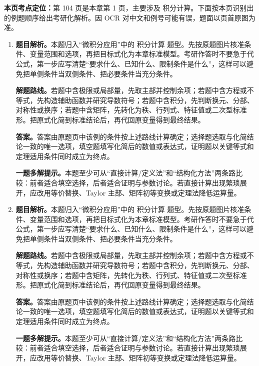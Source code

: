 \begin{solutionblock}
\textbf{本页考点定位：}第 104 页是本章第 1 页，主要涉及 积分计算。下面按本页识别出的例题顺序给出考研化解析。因 OCR 对中文和例号可能有误，题面以页首原图为准。

\begin{enumerate}[label=\textbf{例\arabic*.}, leftmargin=2.4em]

\item \textbf{题目解析。}本题归入“微积分应用”中的 积分计算 题型。先按原题图片核准条件、变量范围和选项，再把目标式化为本章标准模型。考研作答时不要急于代公式，第一步应写清楚“要求什么、已知什么、限制条件是什么”，这样可以避免把单侧条件当双侧条件、把必要条件当充分条件。

\textbf{解题路线。}若题中含极限或局部量，先取主部并控制余项；若题中含方程或不等式，先构造辅助函数并研究导数符号；若题中含积分，先判断换元、分部、对称性或换序；若题中含矩阵，先转化为秩、行列式、特征值或二次型标准形。把原式化简到标准结论后，再代回原变量得到最终结果。

\textbf{答案。}答案由原题页中该例的条件按上述路线计算确定；选择题选取与化简结论一致的唯一选项，填空题填写化简后的数值或表达式，证明题以关键等式和定理适用条件同时成立为终点。

\textbf{一题多解提示。}本题至少可从“直接计算/定义法”和“结构化方法”两条路比较：前者适合填空选择，后者适合证明与参数讨论。若直接计算出现繁琐展开，应改用等价替换、Taylor 主部、矩阵初等变换或定理法降低运算量。

\item \textbf{题目解析。}本题归入“微积分应用”中的 积分计算 题型。先按原题图片核准条件、变量范围和选项，再把目标式化为本章标准模型。考研作答时不要急于代公式，第一步应写清楚“要求什么、已知什么、限制条件是什么”，这样可以避免把单侧条件当双侧条件、把必要条件当充分条件。

\textbf{解题路线。}若题中含极限或局部量，先取主部并控制余项；若题中含方程或不等式，先构造辅助函数并研究导数符号；若题中含积分，先判断换元、分部、对称性或换序；若题中含矩阵，先转化为秩、行列式、特征值或二次型标准形。把原式化简到标准结论后，再代回原变量得到最终结果。

\textbf{答案。}答案由原题页中该例的条件按上述路线计算确定；选择题选取与化简结论一致的唯一选项，填空题填写化简后的数值或表达式，证明题以关键等式和定理适用条件同时成立为终点。

\textbf{一题多解提示。}本题至少可从“直接计算/定义法”和“结构化方法”两条路比较：前者适合填空选择，后者适合证明与参数讨论。若直接计算出现繁琐展开，应改用等价替换、Taylor 主部、矩阵初等变换或定理法降低运算量。

\end{enumerate}
\end{solutionblock}



